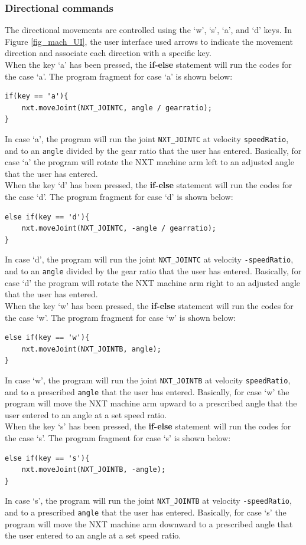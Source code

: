 \documentclass[11pt]{article}
\begin{document}
\subsubsection*{Directional commands}
The directional movements are controlled using the `w', `s', `a', and `d' keys.
In Figure \ref{fig_mach_UI}, the user interface used arrows to indicate the 
movement direction and associate each direction with a specific key.\\
When the key `a' has been pressed, the {\bf if-else} statement will run 
the codes for the case `a'. The program fragment for case `a' is shown below:
\begin{lstlisting}
if(key == 'a'){
    nxt.moveJoint(NXT_JOINTC, angle / gearratio);
}
\end{lstlisting}
In case `a', the program will run the joint {\tt NXT\_JOINTC} at velocity 
{\tt speedRatio}, and to an {\tt angle} divided by the gear ratio that the user 
has entered. Basically, for case `a' the program will rotate the NXT machine arm 
left to an adjusted angle that the user has entered.\\
When the key `d' has been pressed, the {\bf if-else} statement will run 
the codes for the case `d'. The program fragment for case `d' is shown below:
\begin{lstlisting}
else if(key == 'd'){
    nxt.moveJoint(NXT_JOINTC, -angle / gearratio);
}
\end{lstlisting}
In case `d', the program will run the joint {\tt NXT\_JOINTC} at velocity 
{\tt -speedRatio}, and to an {\tt angle} divided by the gear ratio that the user 
has entered. Basically, for case `d' the program will rotate the NXT machine arm 
right to an adjusted angle that the user has entered.\\
When the key `w' has been pressed, the {\bf if-else} statement will run 
the codes for the case `w'. The program fragment for case `w' is shown below:
\begin{lstlisting}
else if(key == 'w'){
    nxt.moveJoint(NXT_JOINTB, angle);
}
\end{lstlisting}
In case `w', the program will run the joint {\tt NXT\_JOINTB} at velocity 
{\tt speedRatio}, and to a prescribed {\tt angle} that the user has entered. 
Basically, for case `w' the program will move the NXT machine arm upward to a 
prescribed angle that the user entered to an angle at a set speed ratio.\\
When the key `s' has been pressed, the {\bf if-else} statement will run 
the codes for the case `s'. The program fragment for case `s' is shown below:
\begin{lstlisting}
else if(key == 's'){
    nxt.moveJoint(NXT_JOINTB, -angle);
}
\end{lstlisting}
In case `s', the program will run the joint {\tt NXT\_JOINTB} at velocity 
{\tt -speedRatio}, and to a prescribed {\tt angle} that the user has entered. 
Basically, for case `s' the program will move the NXT machine arm downward to 
a prescribed angle that the user entered to an angle at a set speed ratio.\\
\end{document}
